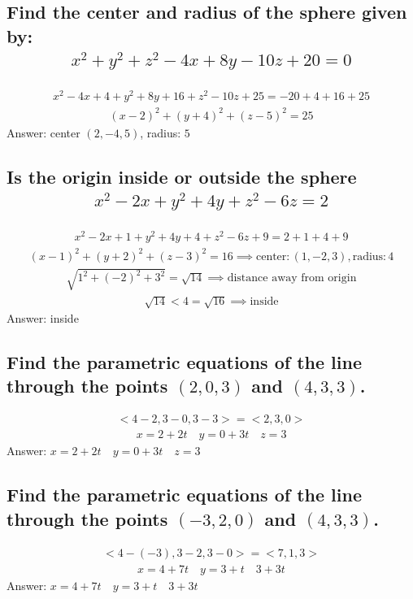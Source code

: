 \documentclass{article}
\begin{document}
\subsection{Find the center and radius of the sphere given by:
	\begin{align*}
		x^2 + y^2 + z^2 -4x + 8y - 10z + 20 = 0
	\end{align*}
}
\begin{align*}
	x^2 - 4x + 4 + y^2 + 8y + 16 +z^2 - 10z + 25 = -20 + 4 + 16 + 25
\end{align*}
\begin{align*}
	(x - 2)^2 + (y + 4)^2 + (z - 5)^2 = 25
\end{align*}
Answer: center $(2, -4, 5)$, radius: $5$

\subsection{Is the origin inside or outside the sphere
	\begin{align*}
		x^2 - 2x + y^2 + 4y + z^2 - 6z = 2
	\end{align*}
}
\begin{align*}
	x^2 - 2x + 1 + y^2 + 4y + 4 + z^2 - 6z + 9 = 2 + 1 + 4 + 9
\end{align*}
\begin{align*}
	(x - 1)^2 + (y + 2)^2 + (z - 3)^2 = 16 \implies \text{center}: (1, -2, 3), \text{radius}: 4
\end{align*}
\begin{align*}
	\sqrt{1^2 + (-2)^2 + 3^2} = \sqrt{14} \implies \text{distance away from origin}
\end{align*}
\begin{align*}
	\sqrt{14} < 4 = \sqrt{16} \implies \text{inside}
\end{align*}
Answer: inside

\subsection{Find the parametric equations of the line through the points $(2, 0, 3)$ and $(4, 3, 3)$.}
\begin{align*}
	<4 - 2, 3 - 0, 3 - 3> = <2, 3, 0>
\end{align*}
\begin{align*}
	x = 2 + 2t \quad y = 0 + 3t \quad z = 3
\end{align*}
Answer: $x = 2 + 2t \quad y = 0 + 3t \quad z = 3$

\subsection{Find the parametric equations of the line through the points $(-3, 2, 0)$ and $(4, 3, 3)$.}
\begin{align*}
	<4 - (-3), 3 - 2, 3 - 0> = <7, 1, 3>
\end{align*}
\begin{align*}
	x = 4 + 7t \quad y = 3 + t \quad 3 + 3t
\end{align*}
Answer: $x = 4 + 7t \quad y = 3 + t \quad 3 + 3t$
\end{document}
